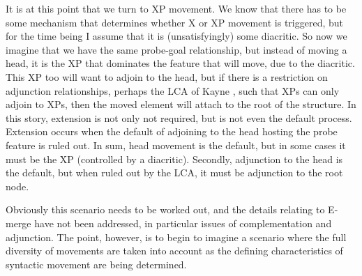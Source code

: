 \documentclass[output=paper,colorlinks,citecolor=brown,
]{langscibook}
\begin{document}
It is at this point that we turn to XP movement.  We know that there has to be some mechanism that determines whether X or XP movement is triggered, but for the time being I assume that it is (unsatisfyingly) some diacritic. So now we imagine that we have the same probe-goal relationship, but instead of moving a head, it is the XP that dominates the feature that will move, due to the diacritic. This XP too will want to adjoin to the head, but if there is a restriction on adjunction relationships, perhaps the LCA of Kayne \citeyearpar{Kayne:1994}, such that XPs can only adjoin to XPs, then the moved element will attach to the root of the structure.  In this story, extension is not only not required, but is not even the default process.  Extension occurs when the default of adjoining to the head hosting the probe feature is ruled out.  In sum, head movement is the default, but in some cases it must be the XP (controlled by a diacritic).  Secondly, adjunction to the head is the default, but when ruled out by the LCA, it must be adjunction to the root node.

Obviously this scenario needs to be worked out, and the details relating to E-merge have not been addressed,  in particular issues of complementation and adjunction.  The point, however, is to begin to imagine a scenario where the full diversity of movements are taken into account as the defining characteristics of syntactic movement are being determined. 



\end{document}
